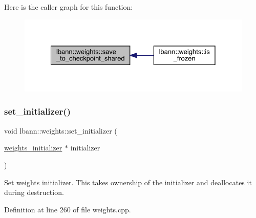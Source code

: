 Here is the caller graph for this function\+:\nopagebreak
\begin{figure}[H]
\begin{center}
\leavevmode
\includegraphics[width=328pt]{classlbann_1_1weights_a48dd6b3d37668bf2ab5abafdf9dabde4_icgraph}
\end{center}
\end{figure}
\mbox{\label{classlbann_1_1weights_a71e56d32d8e9c0e3ddf0ec2d0cd3924d}} 
\subsubsection{\texorpdfstring{set\+\_\+initializer()}{set\_initializer()}}
{\footnotesize\ttfamily void lbann\+::weights\+::set\+\_\+initializer (\begin{DoxyParamCaption}\item[{\hyperlink{classlbann_1_1weights__initializer}{weights\+\_\+initializer} $\ast$}]{initializer }\end{DoxyParamCaption})}

Set weights initializer. This takes ownership of the initializer and deallocates it during destruction. 

Definition at line 260 of file weights.\+cpp.


